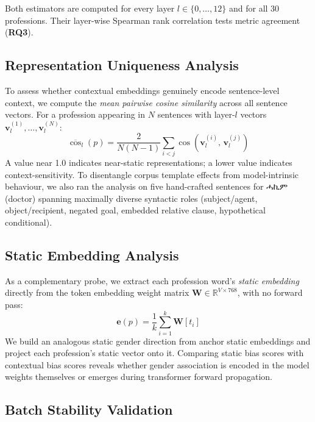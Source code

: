 \documentclass[11pt,a4paper]{article}
\begin{document}
Both estimators are computed for every layer $l \in \{0,\ldots,12\}$ and for
all 30 professions. Their layer-wise Spearman rank correlation tests metric
agreement (\textbf{RQ3}).

\subsection{Representation Uniqueness Analysis}

To assess whether contextual embeddings genuinely encode sentence-level context,
we compute the \emph{mean pairwise cosine similarity} across all sentence
vectors. For a profession appearing in $N$ sentences with layer-$l$ vectors
$\mathbf{v}^{(1)}_l, \ldots, \mathbf{v}^{(N)}_l$:
\begin{equation}
  \overline{\cos}_l(p) = \frac{2}{N(N-1)}
    \sum_{i < j} \cos\!\left(\mathbf{v}^{(i)}_l,\,\mathbf{v}^{(j)}_l\right)
\end{equation}
A value near 1.0 indicates near-static representations; a lower value indicates
context-sensitivity. To disentangle corpus template effects from model-intrinsic
behaviour, we also ran the analysis on five hand-crafted sentences for
{\ethiopicfont ሓኪም} (doctor) spanning maximally diverse syntactic roles (subject/agent,
object/recipient, negated goal, embedded relative clause, hypothetical
conditional).

\subsection{Static Embedding Analysis}

As a complementary probe, we extract each profession word's \emph{static
embedding} directly from the token embedding weight matrix
$\mathbf{W} \in \mathbb{R}^{V \times 768}$, with no forward pass:
\begin{equation}
  \mathbf{e}(p) = \frac{1}{k}\sum_{i=1}^{k} \mathbf{W}[t_i]
\end{equation}
We build an analogous static gender direction from anchor static embeddings and
project each profession's static vector onto it. Comparing static bias scores
with contextual bias scores reveals whether gender association is encoded in the
model weights themselves or emerges during transformer forward propagation.

\subsection{Batch Stability Validation}
\end{document}
